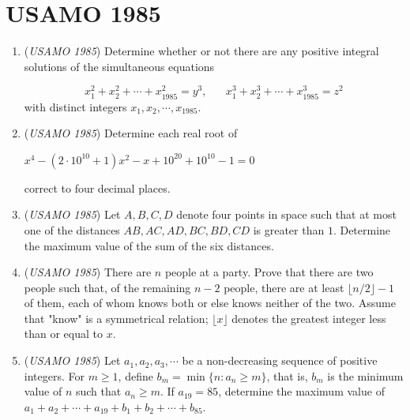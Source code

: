 \section{USAMO 1985}
        \begin{enumerate}
        	\item (\textit{USAMO 1985}) Determine whether or not there are any positive integral solutions of the simultaneous equations 

 \[x_1^2+x_2^2+\cdots+x_{1985}^2=y^3, \hspace{20pt} x_1^3+x_2^3+\cdots+x_{1985}^3=z^2\]
with distinct integers $x_1,x_2,\cdots,x_{1985}$.


 

	\item (\textit{USAMO 1985}) Determine each real root of


 $x^4-(2\cdot10^{10}+1)x^2-x+10^{20}+10^{10}-1=0$


 correct to four decimal places.


 

	\item (\textit{USAMO 1985}) Let $A,B,C,D$ denote four points in space such that at most one of the distances $AB,AC,AD,BC,BD,CD$ is greater than $1$. Determine the maximum value of the sum of the six distances.


 

	\item (\textit{USAMO 1985}) There are $n$ people at a party. Prove that there are two people such that, of the remaining $n-2$ people, there are at least $\lfloor n/2\rfloor -1$ of them, each of whom knows both or else  knows neither of the two. Assume that "know" is a symmetrical relation; $\lfloor x\rfloor$ denotes the greatest integer less than or equal to $x$.


 

	\item (\textit{USAMO 1985}) Let $a_1,a_2,a_3,\cdots$ be a non-decreasing sequence of positive integers. For $m\ge1$, define $b_m=\min\{n: a_n \ge m\}$, that is, $b_m$ is the minimum value of $n$ such that $a_n\ge m$. If $a_{19}=85$, determine the maximum value of
$a_1+a_2+\cdots+a_{19}+b_1+b_2+\cdots+b_{85}$.


 

\end{enumerate}